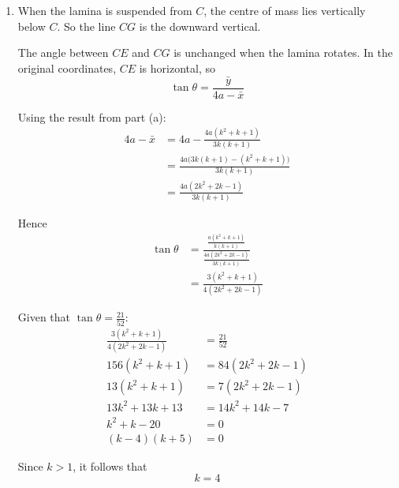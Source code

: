 \documentclass[leqno]{article}
\begin{document}
\begin{enumerate}[
  label=\textbf{\arabic*.},
  leftmargin=*,
  topsep=0pt,
  partopsep=0pt,
  parsep=0pt
]
\begin{djsSolution}
\begin{enumerate}[label=\textbf{(\alph*)}, start=1]
and
\begin{align*}
\bar y
&=\frac{6a^2(a)-\frac{6a^2}{k^2}\left(\frac{a}{k}\right)}
{6a^2\left(1-\frac{1}{k^2}\right)} \\
&=\frac{a\left(1-\frac{1}{k^3}\right)}{1-\frac{1}{k^2}} \\
&=a\times\frac{k^3-1}{k(k^2-1)} \\
&=\frac{a(k^2+k+1)}{k(k+1)}
\end{align*}

So the centre of mass of \(DBCE\) is
\[
\left(\frac{4a(k^2+k+1)}{3k(k+1)},\ \frac{a(k^2+k+1)}{k(k+1)}\right)
\]

  \item When the lamina is suspended from \(C\), the centre of mass lies vertically below \(C\). So the line \(CG\) is the downward vertical.

The angle between \(CE\) and \(CG\) is unchanged when the lamina rotates. In the original coordinates, \(CE\) is horizontal, so
\[
\tan\theta=\frac{\bar y}{4a-\bar x}
\]

Using the result from part (a):
\begin{align*}
4a-\bar x
&=4a-\frac{4a(k^2+k+1)}{3k(k+1)} \\
&=\frac{4a\bigl(3k(k+1)-(k^2+k+1)\bigr)}{3k(k+1)} \\
&=\frac{4a(2k^2+2k-1)}{3k(k+1)}
\end{align*}

Hence
\begin{align*}
\tan\theta
&=\frac{\frac{a(k^2+k+1)}{k(k+1)}}{\frac{4a(2k^2+2k-1)}{3k(k+1)}} \\
&=\frac{3(k^2+k+1)}{4(2k^2+2k-1)}
\end{align*}

Given that \(\tan\theta=\frac{21}{52}\):
\begin{align*}
\frac{3(k^2+k+1)}{4(2k^2+2k-1)}&=\frac{21}{52} \\
156(k^2+k+1)&=84(2k^2+2k-1) \\
13(k^2+k+1)&=7(2k^2+2k-1) \\
13k^2+13k+13&=14k^2+14k-7 \\
k^2+k-20&=0 \\
(k-4)(k+5)&=0
\end{align*}

Since \(k>1\), it follows that
\[
k=4
\]
\end{enumerate}
\end{djsSolution}


\newpage

\questionitem


\end{enumerate}
\end{document}
